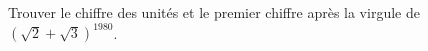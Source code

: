 Trouver le chiffre des unités et le premier chiffre après la virgule de $(\sqrt{2} + \sqrt{3})^{1980}$.
